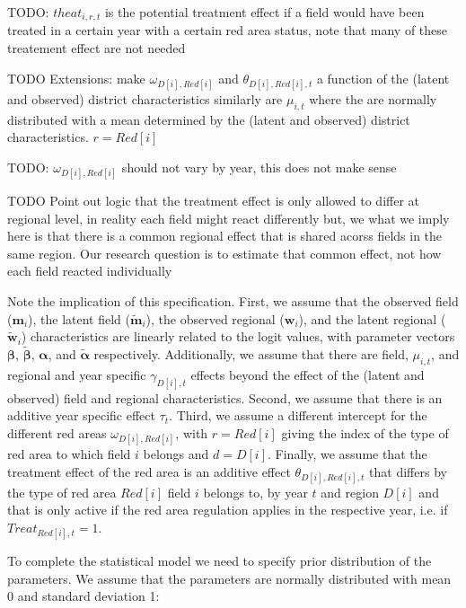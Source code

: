 \documentclass{article}
\begin{document}
\par
TODO: $theat_{i,r,t}$ is the potential treatment effect if a field
would have been treated in a certain year with a certain red area status, 
note that many of these treatement effect are not needed 

\par
TODO Extensions: make $\omega_{D[i],Red[i]}$ and $\theta_{D[i],Red[i],t}$ a function of the (latent and observed) 
district characteristics similarly are $\mu_{i,t}$ where the are normally distributed with a 
mean determined by the (latent and observed) district characteristics.
$r=Red[i]$
\par
TODO: $\omega_{D[i],Red[i]}$ should not vary by year, this does not make sense
\par
TODO Point out logic that the treatment effect is only allowed to differ at regional level, 
in reality each field might react differently but, we what we imply here is that there
is a common regional effect that is shared acorss fields in the same region. Our research question 
is to estimate that common effect, not how each field reacted individually
\par

Note the implication of this specification. First, we assume that the
observed field ($\mathbf{m}_i$), the latent field ($\tilde{\mathbf{m}}_i$), the observed regional 
($\mathbf{w}_i$), and the latent regional ($\tilde{\mathbf{w}}_i$) characteristics are linearly 
related to the logit values, with parameter vectors $\mathbf{\beta}$, $\tilde{\mathbf{\beta}}$,  
$\mathbf{\alpha}$, and $\tilde{\mathbf{\alpha}}$ respectively. Additionally, we assume 
that there are field, $\mu_{i,t}$, and regional and year specific $\gamma_{D[i],t}$ effects beyond the 
effect of the (latent and observed) field and regional characteristics.
Second, we assume that there is an additive year specific effect 
$\tau_{t}$. Third, we assume a different intercept for the different red 
areas $\omega_{D[i],Red[i]}$, with $r=Red[i]$ giving the index of the type of red area
to which field $i$ belongs and $d=D[i]$. Finally, we assume that the treatment effect of the red area
is an additive effect $\theta_{D[i],Red[i],t}$ that differs by the type of 
red area $Red[i]$ field $i$ belongs to, by year $t$ and region $D[i]$ and that is only active if the 
red area regulation applies in the respective year,
i.e. if $Treat_{Red[i],t}=1$.

\par
To complete the statistical model we need to specify prior distribution of the
parameters. We assume that the parameters are normally distributed with mean 0 
and standard deviation 1:
\end{document}

